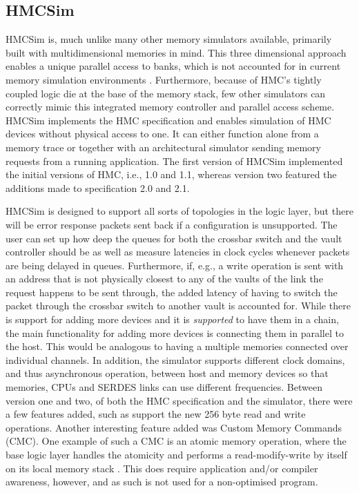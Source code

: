 \subsection{HMCSim} \label{HMC-Sim}
HMCSim is, much unlike many other memory simulators available, primarily built with multidimensional memories in mind. This three dimensional approach enables a unique parallel access to banks, which is not accounted for in current memory simulation environments \cite{6969550}. Furthermore, because of HMC's tightly coupled logic die at the base of the memory stack, few other simulators can correctly mimic this integrated memory controller and parallel access scheme. HMCSim implements the HMC specification and enables simulation of HMC devices without physical access to one. It can either function alone from a memory trace or together with an architectural simulator sending memory requests from a running application. The first version of HMCSim implemented the initial versions of HMC, i.e., 1.0 and 1.1, whereas version two featured the additions made to specification 2.0 and 2.1.
\bigskip

HMCSim is designed to support all sorts of topologies in the logic layer, but there will be error response packets sent back if a configuration is unsupported. The user can set up how deep the queues for both the crossbar switch and the vault controller should be as well as measure latencies in clock cycles whenever packets are being delayed in queues. Furthermore, if, e.g., a write operation is sent with an address that is not physically closest to any of the vaults of the link the request happens to be sent through, the added latency of having to switch the packet through the crossbar switch to another vault is accounted for. While there is support for adding more devices and it is \emph{supported} to have them in a chain, the main functionality for adding more devices is connecting them in parallel to the host. This would be analogous to having a multiple memories connected over individual channels. In addition, the simulator supports different clock domains, and thus asynchronous operation, between host and memory devices so that memories, CPUs and SERDES links can use different frequencies. Between version one and two, of both the HMC specification and the simulator, there were a few features added, such as support the new 256 byte read and write operations. Another interesting feature added was Custom Memory Commands (CMC). One example of such a CMC is an atomic memory operation, where the base logic layer handles the atomicity and performs a read-modify-write by itself on its local memory stack \cite{7529923}. This does require application and/or compiler awareness, however, and as such is not used for a non-optimised program.
\bigskip

